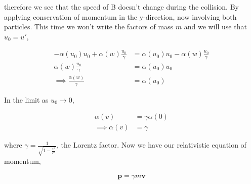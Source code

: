 \documentclass[11pt]{amsart}
\begin{document}
therefore we see that the speed of B doesn't change during the collision. By applying conservation of momentum in the y-direction, now involving both particles. This time we won't write the factors of mass $m$ and we will use that $u_0 = u'$,

\begin{align*}
  -\alpha(u_0) u_0 + \alpha(w)\frac{u_0}{\gamma} &= \alpha(u_0)u_0 - \alpha(w)\frac{u_0}{\gamma} \\
  \alpha(w)\frac{u_0}{\gamma} &= \alpha(u_0) u_0 \\
  \implies \frac{\alpha(w)}{\gamma} &= \alpha(u_0)
\end{align*}

In the limit as $u_0 \to 0$,

\begin{align*}
  \alpha(v) &= \gamma \alpha(0) \\
  \implies \alpha(v) &= \gamma
\end{align*}

where $\gamma = \frac{1}{\sqrt{1-\frac{v^2}{c^2}}}$, the Lorentz factor. Now we have our relativistic equation of momentum,

\begin{align*}
  \mathbf{p} = \gamma m \mathbf{v}
\end{align*}
\end{document}

